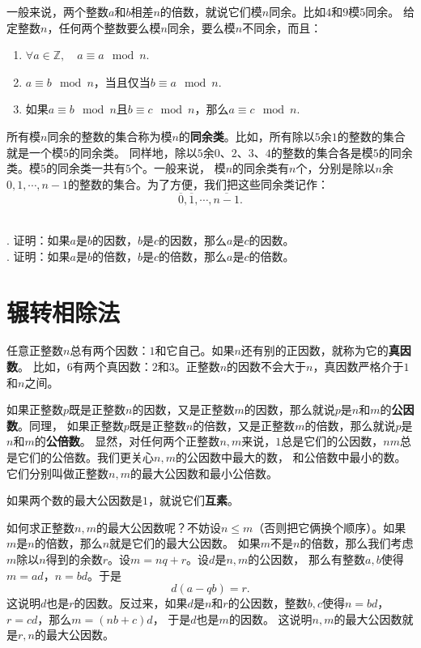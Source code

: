 \documentclass[12pt,UTF8]{ctexbook}
\begin{document}
一般来说，两个整数$a$和$b$相差$n$的倍数，就说它们模$n$同余。比如$4$和$9$模$5$同余。
给定整数$n$，任何两个整数要么模$n$同余，要么模$n$不同余，而且：
\begin{enumerate}
    \item $\forall a \in \mathbb{Z}, \quad a \equiv a \mod n.$
    \item $a \equiv b \mod n$，当且仅当$b \equiv a \mod n.$
    \item 如果$a \equiv b \mod n$且$b \equiv c \mod n$，那么$a \equiv c \mod n.$
\end{enumerate}
所有模$n$同余的整数的集合称为模$n$的\textbf{同余类}。比如，所有除以$5$余$1$的整数的集合就是一个模$5$的同余类。
同样地，除以$5$余$0$、$2$、$3$、$4$的整数的集合各是模$5$的同余类。模$5$的同余类一共有$5$个。一般来说，
模$n$的同余类有$n$个，分别是除以$n$余$0,1,\cdots,n-1$的整数的集合。为了方便，我们把这些同余类记作：
$$ \overline{0}, \overline{1}, \cdots , \overline{n-1}.$$
\begin{xt}\label{xt:5-0-0}
    \mbox{}\\
    . 证明：如果$a$是$b$的因数，$b$是$c$的因数，那么$a$是$c$的因数。\\
    . 证明：如果$a$是$b$的倍数，$b$是$c$的倍数，那么$a$是$c$的倍数。
\end{xt}

\section{辗转相除法}
任意正整数$n$总有两个因数：$1$和它自己。如果$n$还有别的正因数，就称为它的\textbf{真因数}。
比如，$6$有两个真因数：$2$和$3$。正整数$n$的因数不会大于$n$，真因数严格介于$1$和$n$之间。

如果正整数$p$既是正整数$n$的因数，又是正整数$m$的因数，那么就说$p$是$n$和$m$的\textbf{公因数}。同理，
如果正整数$p$既是正整数$n$的倍数，又是正整数$m$的倍数，那么就说$p$是$n$和$m$的\textbf{公倍数}。
显然，对任何两个正整数$n,m$来说，$1$总是它们的公因数，$nm$总是它们的公倍数。我们更关心$n,m$的公因数中最大的数，
和公倍数中最小的数。它们分别叫做正整数$n,m$的最大公因数和最小公倍数。

如果两个数的最大公因数是$1$，就说它们\textbf{互素}。

如何求正整数$n,m$的最大公因数呢？不妨设$n\leqslant m$（否则把它俩换个顺序）。如果$m$是$n$的倍数，那么$n$就是它们的最大公因数。
如果$m$不是$n$的倍数，那么我们考虑$m$除以$n$得到的余数$r$。设$m = nq + r$。设$d$是$n,m$的公因数，
那么有整数$a,b$使得$m = ad$，$n = bd$。于是
$$ d(a - qb) = r.$$
这说明$d$也是$r$的因数。反过来，如果$d$是$n$和$r$的公因数，整数$b, c$使得$n = bd$，$r = cd$，那么$m = (nb + c)d$，
于是$d$也是$m$的因数。
这说明$n,m$的最大公因数就是$r,n$的最大公因数。
\end{document}
